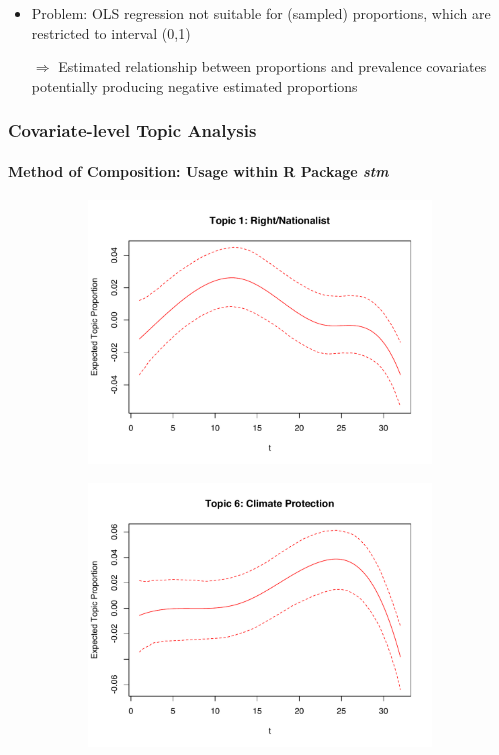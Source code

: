\documentclass[xcolor=dvipsnames]{beamer}
\begin{document}
\begin{frame}
\begin{itemize}
\item Problem: OLS regression not suitable for (sampled) proportions, which are restricted to interval (0,1)
\item[$\Rightarrow$] Estimated relationship between proportions and prevalence covariates potentially producing negative estimated proportions
\end{itemize}
\frametitle{Covariate-level Topic Analysis}
\framesubtitle{Method of Composition: Usage within R Package \textit{stm}}
  \begin{figure}[h!]
  \centering
  \captionsetup{justification=centering,margin=2cm}
  \begin{subfigure}[b]{0.4\linewidth}
    \includegraphics[width=\linewidth]{../plots/presentation/estEffect_topic1.pdf}
  \end{subfigure}
  \begin{subfigure}[b]{0.4\linewidth}
    \includegraphics[width=\linewidth]{../plots/presentation/estEffect_topic6.pdf}
  \end{subfigure}
\end{figure}
\end{frame}
\end{document}
